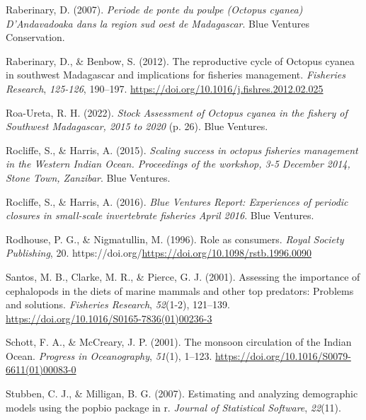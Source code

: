 \documentclass[
]{article}
\newlength{\cslhangindent}
\newlength{\cslentryspacingunit} %
\newenvironment{CSLReferences}[2] %
 {%
  \setlength{\parindent}{0pt}
  \ifodd #1
  \let\oldpar\par
  \def\par{\hangindent=\cslhangindent\oldpar}
  \fi
  \setlength{\parskip}{#2\cslentryspacingunit}
 }%
 {}
\begin{document}
\begin{CSLReferences}{1}{2}
\leavevmode{}%
Raberinary, D. (2007). \emph{Periode de ponte du poulpe ({Octopus} cyanea) {D}'{Andavadoaka} dans la region sud oest de {Madagascar}}. Blue Ventures Conservation.

\leavevmode{}%
Raberinary, D., \& Benbow, S. (2012). The reproductive cycle of {Octopus} cyanea in southwest {Madagascar} and implications for fisheries management. \emph{Fisheries Research}, \emph{125-126}, 190--197. \url{https://doi.org/10.1016/j.fishres.2012.02.025}

\leavevmode{}%
Roa-Ureta, R. H. (2022). \emph{Stock {Assessment} of {Octopus} cyanea in the fishery of {Southwest} {Madagascar}, 2015 to 2020} (p. 26). Blue Ventures.

\leavevmode{}%
Rocliffe, S., \& Harris, A. (2015). \emph{Scaling success in octopus fisheries management in the {Western} {Indian} {Ocean}. {Proceedings} of the workshop, 3-5 {December} 2014, {Stone} {Town}, {Zanzibar}}. Blue Ventures.

\leavevmode{}%
Rocliffe, S., \& Harris, A. (2016). \emph{Blue {Ventures} {Report}: {Experiences} of periodic closures in small-scale invertebrate fisheries {April} 2016}. Blue Ventures.

\leavevmode{}%
Rodhouse, P. G., \& Nigmatullin, M. (1996). Role as consumers. \emph{Royal Society Publishing}, 20. https://doi.org/\url{https://doi.org/10.1098/rstb.1996.0090}

\leavevmode{}%
Santos, M. B., Clarke, M. R., \& Pierce, G. J. (2001). Assessing the importance of cephalopods in the diets of marine mammals and other top predators: Problems and solutions. \emph{Fisheries Research}, \emph{52}(1-2), 121--139. \url{https://doi.org/10.1016/S0165-7836(01)00236-3}

\leavevmode{}%
Schott, F. A., \& McCreary, J. P. (2001). The monsoon circulation of the {Indian} {Ocean}. \emph{Progress in Oceanography}, \emph{51}(1), 1--123. \url{https://doi.org/10.1016/S0079-6611(01)00083-0}

\leavevmode{}%
Stubben, C. J., \& Milligan, B. G. (2007). Estimating and analyzing demographic models using the popbio package in r. \emph{Journal of Statistical Software}, \emph{22}(11).


\end{CSLReferences}
\end{document}
